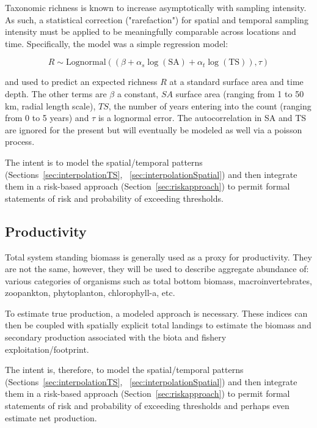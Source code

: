 \documentclass[letterpaper,portrait,11pt]{scrartcl}
\numberwithin{equation}{section}    %
\numberwithin{figure}{section}    %
\numberwithin{table}{section}       %
\begin{document}
Taxonomic richness is known to increase asymptotically with sampling intensity. As such, a statistical correction ("rarefaction") for spatial and temporal sampling intensity must be applied to be meaningfully comparable across locations and time. Specifically, the model was a simple regression model:


\begin{equation}
  \label{eq:biodiversity}
  R \sim \text{Lognormal} ( (\beta + \alpha_s \log(\text{SA}) + \alpha_t \log(\text{TS}) ),  \tau )
\end{equation}


and used to predict an expected richness $R$ at a standard surface area and time depth. The other terms are $\beta$ a constant, $SA$ surface area (ranging from 1 to 50 km, radial length scale), $TS$, the number of years entering into the count (ranging from 0 to 5 years) and $\tau$ is a lognormal error. The autocorrelation in SA and TS are ignored for the present but will eventually be modeled as well via a poisson process.

The intent is to model the spatial/temporal patterns (Sections~\ref{sec:interpolationTS}, ~\ref{sec:interpolationSpatial}) and then integrate them in a risk-based approach (Section~\ref{sec:riskapproach}) to permit formal statements of risk and probability of exceeding thresholds.


\subsection{Productivity}

Total system standing biomass is generally used as a proxy for productivity. They are not the same, however, they will be used to describe aggregate abundance of: various categories of organisms such as total bottom biomass, macroinvertebrates, zoopankton, phytoplanton, chlorophyll-a, etc.

To estimate true production, a modeled approach is necessary. These indices can then be coupled with spatially explicit total landings to estimate the biomass and secondary production associated with the biota and fishery exploitation/footprint.

The intent is, therefore, to model the spatial/temporal patterns (Sections~\ref{sec:interpolationTS}, ~\ref{sec:interpolationSpatial}) and then integrate them in a risk-based approach (Section~\ref{sec:riskapproach}) to permit formal statements of risk and probability of exceeding thresholds and perhaps even estimate net production.
\end{document}
